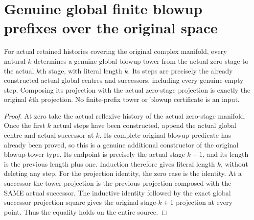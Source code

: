 \section{Genuine global finite blowup prefixes over the original space}

\begin{theorem}
\label{hir:sharp-actual-curve-genuine-global-prefix-tower}
\leanok
For actual retained histories covering the original complex manifold,
every natural $k$ determines a genuine global blowup tower from the actual
zero stage to the actual $k$th stage, with literal length $k$. Its steps
are precisely the already constructed actual global centres and successors,
including every genuine empty step. Composing its projection with the
actual zero-stage projection is exactly the original $k$th projection.
No finite-prefix tower or blowup certificate is an input.
\end{theorem}
\begin{proof}
At zero take the actual reflexive history of the actual zero-stage
manifold. Once the first $k$ actual steps have been constructed, append
the actual global centre and actual successor at $k$. Its complete original
blowup predicate has already been proved, so this is a genuine additional
constructor of the original blowup-tower type. Its endpoint is precisely
the actual stage $k+1$, and its length is the previous length plus one.
Induction therefore gives literal length $k$, without deleting any step.
For the projection identity, the zero case is the identity. At a
successor the tower projection is the previous projection composed with
the SAME actual successor. The inductive identity followed by the exact
global successor projection square gives the original stage-$k+1$
projection at every point. Thus the equality holds on the entire source.
\end{proof}

